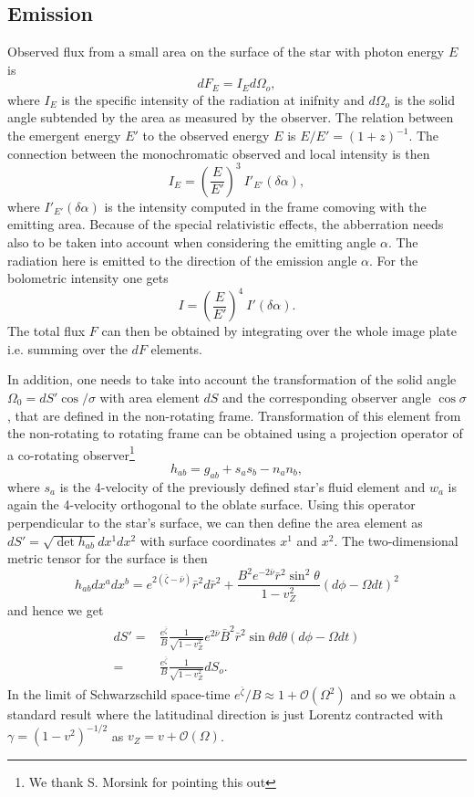 \documentclass[iop, usenatbib]{emulateapj}
\newcommand{\be}{\begin{equation}}
\newcommand{\ee}{\end{equation}}
\newcommand{\sch}{Schwarzschild }
\newcommand{\rb}{\ensuremath{\bar{r}}}
\newcommand{\nub}{\ensuremath{\bar{\nu}}}
\newcommand{\zetab}{\ensuremath{\bar{\zeta}}}
\newcommand{\Bb}{\ensuremath{\bar{B}}}
\begin{document}
\subsection{Emission}
Observed flux from a small area on the surface of the star with photon energy $E$ is
\be
dF_E = I_E d\Omega_o,
\ee
where $I_E$ is the specific intensity of the radiation at inifnity and $d\Omega_o$ is the solid angle subtended by the area as measured by the observer.
The relation between the emergent energy $E'$ to the observed energy $E$ is $E/E' = (1 + z)^{-1}$.
The connection between the monochromatic observed and local intensity is then \citep[see e.g.,][]{MTW73, RL79}
\be
I_E = \left( \frac{E}{E'} \right)^3 ~I'_{E'}(\delta \alpha),
\ee
where $I'_{E'}(\delta \alpha)$ is the intensity computed in the frame comoving with the emitting area.
Because of the special relativistic effects, the abberration needs also to be taken into account when considering the emitting angle $\alpha$.
The radiation here is emitted to the direction of the emission angle $\alpha$.
For the bolometric intensity one gets
\be
I = \left(\frac{E}{E'} \right)^4 ~I'(\delta \alpha).
\ee
The total flux $F$ can then be obtained by integrating over the whole image plate i.e. summing over the $dF$ elements.

In addition, one needs to take into account the transformation of the solid angle $\Omega_0 = dS'\cos/\sigma$ with area element $dS$ and the corresponding observer angle $\cos\sigma$, that are defined in the non-rotating frame.
Transformation of this element from the non-rotating to rotating frame can be obtained using a projection operator of a co-rotating observer\footnote{We thank S. Morsink for pointing this out}
\be
h_{ab} = g_{ab} + s_a s_b - n_a n_b,
\ee
where $s_a$ is the 4-velocity of the previously defined star's fluid element and $w_a$ is again the 4-velocity orthogonal to the oblate surface. 
Using this operator perpendicular to the star's surface, we can then define the area element as $dS' = \sqrt{\det{h_{ab}}} dx^1 dx^2$ with surface coordinates $x^1$ and $x^2$.
The two-dimensional metric tensor for the surface is then
\be
h_{ab} dx^a dx^b = e^{2(\zetab - \nub)} \rb^2 d\rb^2 + \frac{B^2 e^{-2\nub} \rb^2 \sin^2\theta}{1-v_Z^2} (d\phi - \Omega dt)^2
\ee
and hence we get
\begin{align}\begin{split}
dS' =& \frac{e^{\zetab}}{B} \frac{1}{\sqrt{1-v_Z^2}} e^{2\nub} \Bb^2 \rb^2 \sin\theta d\theta (d\phi - \Omega dt) \\
  =& \frac{e^{\zetab}}{B} \frac{1}{\sqrt{1-v_Z^2}} dS_o.
\end{split}\end{align}
In the limit of \sch space-time $e^{\zetab}/B \approx 1 + \mathcal{O}(\Omega^2)$ and so we obtain a standard result where the latitudinal direction is just Lorentz contracted with $\gamma = (1-v^2)^{-1/2}$ as $v_Z = v + \mathcal{O}(\Omega)$.
\end{document}
